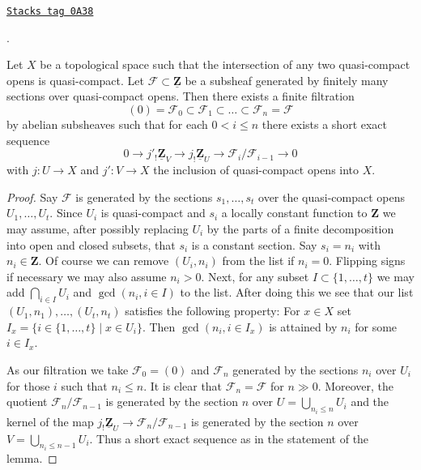 \begin{lemma}
\label{cohomology-lemma-subsheaf-of-constant-sheaf}
\href{https://stacks.math.columbia.edu/tag/0A38}{\texttt{Stacks tag 0A38}}

\begin{reference}
\cite[Page 168]{Tohoku}.
\end{reference}
Let $X$ be a topological space such that the intersection of any
two quasi-compact opens is quasi-compact. Let
$\mathcal{F} \subset \underline{\mathbf{Z}}$
be a subsheaf generated by finitely many sections over quasi-compact opens.
Then there exists a finite filtration
$$
(0) = \mathcal{F}_0 \subset \mathcal{F}_1 \subset \ldots \subset
\mathcal{F}_n = \mathcal{F}
$$
by abelian subsheaves such that for each $0 < i \leq n$
there exists a short exact sequence
$$
0 \to j'_!\underline{\mathbf{Z}}_V \to j_!\underline{\mathbf{Z}}_U \to
\mathcal{F}_i/\mathcal{F}_{i - 1} \to 0
$$
with $j : U \to X$ and $j' : V \to X$ the inclusion of quasi-compact opens
into $X$.
\end{lemma}

\begin{proof}
Say $\mathcal{F}$ is generated by the sections $s_1, \ldots, s_t$ over the
quasi-compact opens $U_1, \ldots, U_t$. Since $U_i$ is quasi-compact and
$s_i$ a locally constant function to $\mathbf{Z}$ we may assume, after
possibly replacing $U_i$ by the parts of a finite decomposition into open
and closed subsets, that $s_i$ is a constant section.
Say $s_i = n_i$ with $n_i \in \mathbf{Z}$. Of course we can remove
$(U_i, n_i)$ from the list if $n_i = 0$. Flipping signs if necessary
we may also assume $n_i > 0$. Next, for any subset $I \subset \{1, \ldots, t\}$
we may add $\bigcap_{i \in I} U_i$ and $\gcd(n_i, i \in I)$ to the list.
After doing this we see that our list $(U_1, n_1), \ldots, (U_t, n_t)$
satisfies the following property:
For $x \in X$ set $I_x = \{i \in \{1, \ldots, t\} \mid x \in U_i\}$.
Then $\gcd(n_i, i \in I_x)$ is attained by $n_i$ for some $i \in I_x$.

\medskip\noindent
As our filtration we take $\mathcal{F}_0 = (0)$ and
$\mathcal{F}_n$ generated by the sections $n_i$ over $U_i$ for those
$i$ such that $n_i \leq n$. It is clear that
$\mathcal{F}_n = \mathcal{F}$ for $n \gg 0$. Moreover, the quotient
$\mathcal{F}_n/\mathcal{F}_{n - 1}$ is generated by the section
$n$ over $U = \bigcup_{n_i \leq n} U_i$ and the kernel of the map
$j_!\underline{\mathbf{Z}}_U \to \mathcal{F}_n/\mathcal{F}_{n - 1}$
is generated by the section $n$ over $V = \bigcup_{n_i \leq n - 1} U_i$.
Thus a short exact sequence as in the statement of the lemma.
\end{proof}

